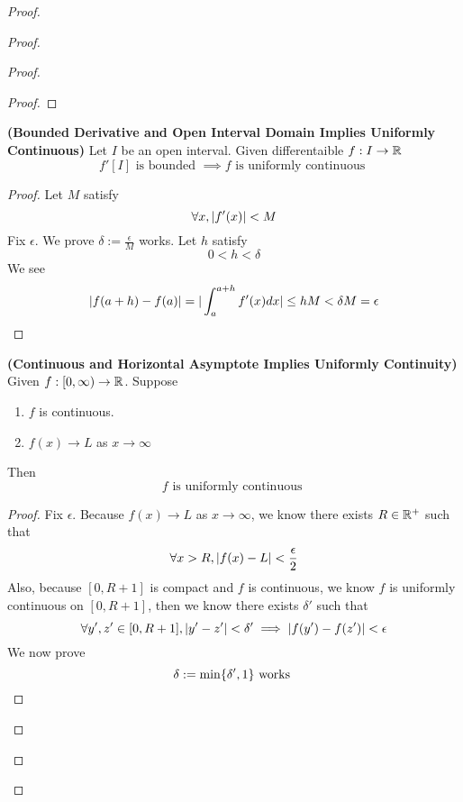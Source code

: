 \documentclass{report}
\begin{document}
\begin{proof}
\begin{proof}
\begin{proof}
\begin{proof}
\end{proof}
\begin{theorem}
\label{5.4.2}
\textbf{(Bounded Derivative and Open Interval Domain Implies Uniformly Continuous)} Let $I$ be an open interval. Given differentaible $f:I\rightarrow \mathbb{R}$ 
\begin{equation*}
f'[I]\text{ is bounded }\implies f\text{ is uniformly continuous }
\end{equation*}
\end{theorem}
\begin{proof}
Let $M$ satisfy
 \begin{equation*}
\forall x, |f'(x)|<M
\end{equation*}
Fix $\epsilon $. We prove $\delta:=\frac{\epsilon}{M}$ works. Let $h$ satisfy
\begin{equation*}
0<h<\delta
\end{equation*}
We see 
\begin{equation*}
  |f(a+h)-f(a)|=|\int_a^{a+h}f'(x)dx| \leq hM<\delta M=\epsilon 
\end{equation*}
\end{proof}
\begin{theorem}
\label{5.4.3}
\textbf{(Continuous and Horizontal Asymptote Implies Uniformly Continuity)} 
Given $f:[0,\infty)\rightarrow \mathbb{R}$. Suppose 
\begin{enumerate}[label=(\alph*)]
  \item $f$ is continuous.
  \item $f(x)\to L$ as $x\to \infty$
\end{enumerate}
Then
\begin{equation*}
f\text{ is uniformly continuous }
\end{equation*}
\end{theorem}
\begin{proof}
Fix $\epsilon $. 
Because $f(x)\to L$ as $x\to \infty$, we know there exists $R\in\mathbb{R}^+$ such that 
\begin{equation*}
\forall x>R, |f(x)-L|<\frac{\epsilon}{2}
\end{equation*}
Also, because $[0,R+1]$ is compact and $f$ is continuous, we know $f$ is uniformly continuous on  $[0,R+1]$, then we know there exists $\delta'$ such that 
\begin{equation*}
\forall y',z'\in [0,R+1], |y'-z'|<\delta'\implies |f(y')-f(z')|<\epsilon 
\end{equation*}
We now prove 
\begin{equation*}
\delta:=\min \set{\delta',1}\text{ works }

\end{equation*}
\end{proof}
\end{proof}
\end{proof}
\end{proof}
\end{document}
